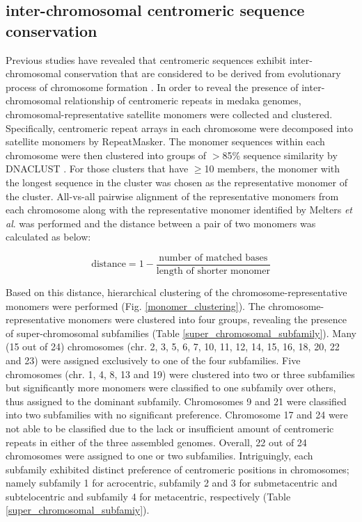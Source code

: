 \subsection*{inter-chromosomal centromeric sequence conservation}
Previous studies have revealed that centromeric sequences exhibit inter-chromosomal conservation that are considered to be derived from evolutionary process of chromosome formation \cite{}. In order to reveal the presence of inter-chromosomal relationship of centromeric repeats in medaka genomes, chromosomal-representative satellite monomers were collected and clustered. Specifically, centromeric repeat arrays in each chromosome were decomposed into satellite monomers by RepeatMasker. The monomer sequences within each chromosome were then clustered into groups of $>$85\% sequence similarity by DNACLUST \cite{}. For those clusters that have $\geq$10 members, the monomer with the longest sequence in the cluster was chosen as the representative monomer of the cluster. All-vs-all pairwise alignment of the representative monomers from each chromosome along with the representative monomer identified by Melters \textit{et al}. was performed and the distance between a pair of two monomers was calculated as below:

\[
  \mbox{distance} = 1 - \frac{\mbox{number of matched bases}}{\mbox{length of shorter monomer}}
\]

Based on this distance, hierarchical clustering of the chromosome-representative monomers were performed (Fig. \ref{monomer_clustering}). The chromosome-representative monomers were clustered into four groups, revealing the presence of super-chromosomal subfamilies (Table \ref{super_chromosomal_subfamily}). Many (15 out of 24) chromosomes (chr. 2, 3, 5, 6, 7, 10, 11, 12, 14, 15, 16, 18, 20, 22 and 23) were assigned exclusively to one of the four subfamilies. Five chromosomes (chr. 1, 4, 8, 13 and 19) were clustered into two or three subfamilies but significantly more monomers were classified to one subfamily over others, thus assigned to the dominant subfamily. Chromosomes 9 and 21 were classified into two subfamilies with no significant preference. Chromosome 17 and 24 were not able to be classified due to the lack or insufficient amount of centromeric repeats in either of the three assembled genomes. Overall, 22 out of 24 chromosomes were assigned to one or two subfamilies. Intriguingly, each subfamily exhibited distinct preference of centromeric positions in chromosomes; namely subfamily 1 for acrocentric, subfamily 2 and 3 for submetacentric and subtelocentric and subfamily 4 for metacentric, respectively (Table \ref{super_chromosomal_subfamiy}).


